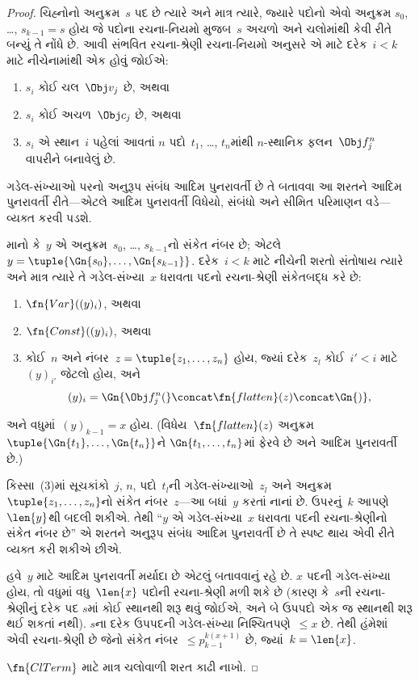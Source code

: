 \begin{proof}
ચિહ્નોનો અનુક્રમ~$s$ પદ છે ત્યારે અને
માત્ર ત્યારે, જ્યારે પદોનો એવો અનુક્રમ
$s_0$, \dots, $s_{k-1} = s$ હોય જે
પદોના રચના-નિયમો મુજબ~$s$ અચળો અને
ચલોમાંથી કેવી રીતે બન્યું તે નોંધે છે.
આવી સંભવિત રચના-શ્રેણી રચના-નિયમો
અનુસરે એ માટે દરેક~$i < k$ માટે
નીચેનામાંથી એક હોવું જોઈએ:
\begin{enumerate}
\item $s_i$ કોઈ ચલ~$\Obj v_j$ છે, અથવા
\item $s_i$ કોઈ અચળ~$\Obj c_j$ છે, અથવા
\item $s_i$ એ સ્થાન~$i$ પહેલાં આવતાં
  $n$ પદો~$t_1$, \dots, $t_n$માંથી
  $n$-સ્થાનિક ફલન~$\Obj f^n_j$
  વાપરીને બનાવેલું છે.
\end{enumerate}
ગડેલ-સંખ્યાઓ પરનો અનુરૂપ સંબંધ આદિમ
પુનરાવર્તી છે તે બતાવવા આ શરતને
આદિમ પુનરાવર્તી રીતે—એટલે આદિમ
પુનરાવર્તી વિધેયો, સંબંધો અને સીમિત
પરિમાણન વડે—વ્યક્ત કરવી પડશે.

માનો કે~$y$ એ અનુક્રમ~$s_0$, \dots,
$s_{k-1}$નો સંકેત નંબર છે; એટલે
$y = \tuple{\Gn{s_0}, \dots, \Gn{s_{k-1}}}$.
દરેક~$i < k$ માટે નીચેની શરતો
સંતોષાય ત્યારે અને માત્ર ત્યારે તે
ગડેલ-સંખ્યા~$x$ ધરાવતા પદનો
રચના-શ્રેણી સંકેતબદ્ધ કરે છે:
\begin{enumerate}
\item $\fn{Var}((y)_i)$, અથવા
\item $\fn{Const}((y)_i)$, અથવા
\item કોઈ~$n$ અને
  નંબર~$z = \tuple{z_1, \dots, z_n}$
  હોય, જ્યાં દરેક~$z_l$ કોઈ~$i' < i$
  માટે~$(y)_{i'}$ જેટલો હોય, અને
\[
(y)_i = \Gn{\Obj f^n_j(} \concat \fn{flatten}(z) \concat \Gn{)},
\]
\end{enumerate}
અને વધુમાં~$(y)_{k-1} = x$ હોય.
(વિધેય~$\fn{flatten}(z)$ અનુક્રમ
$\tuple{\Gn{t_1}, \dots, \Gn{t_n}}$ને
$\Gn{t_1, \dots,
  t_n}$માં ફેરવે છે અને આદિમ પુનરાવર્તી છે.)

કિસ્સા~(3)માં સૂચકાંકો~$j$, $n$, પદો~$t_l$ની
ગડેલ-સંખ્યાઓ~$z_l$ અને
અનુક્રમ~$\tuple{z_1, \dots, z_n}$નો
સંકેત નંબર~$z$—આ બધાં~$y$ કરતાં
નાનાં છે. ઉપરનું~$k$ આપણે~$\len{y}$થી
બદલી શકીએ. તેથી ``$y$ એ ગડેલ-સંખ્યા~$x$
ધરાવતા પદની રચના-શ્રેણીનો સંકેત
નંબર છે'' એ શરતને અનુરૂપ સંબંધ
આદિમ પુનરાવર્તી છે તે સ્પષ્ટ થાય
એવી રીતે વ્યક્ત કરી શકીએ છીએ.

હવે~$y$ માટે આદિમ પુનરાવર્તી મર્યાદા
છે એટલું બતાવવાનું રહે છે. $x$ પદની
ગડેલ-સંખ્યા હોય, તો વધુમાં વધુ~$\len{x}$
પદોની રચના-શ્રેણી મળી શકે છે
(કારણ કે~$s$ની રચના-શ્રેણીનું દરેક પદ
$s$માં કોઈ સ્થાનથી શરૂ થવું જોઈએ,
અને બે ઉપપદો એક જ સ્થાનથી શરૂ
થઈ શકતાં નથી). $s$ના દરેક ઉપપદની
ગડેલ-સંખ્યા નિશ્ચિતપણે~$\le x$ છે.
તેથી હંમેશાં એવી રચના-શ્રેણી છે જેનો
સંકેત નંબર~$\le p_{k-1}^{k(x+1)}$ છે,
જ્યાં~$k=\len{x}$.

$\fn{ClTerm}$ માટે માત્ર
ચલોવાળી શરત કાઢી નાખો.
\end{proof}

